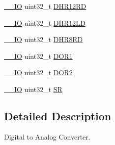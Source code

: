 \begin{DoxyCompactItemize}
\item 
\hyperlink{core__sc300_8h_aec43007d9998a0a0e01faede4133d6be}{\-\_\-\-\_\-\-I\-O} uint32\-\_\-t \hyperlink{struct_d_a_c___type_def_affa5cc9fe0cc9eb594d703bdc9d9abd9}{D\-H\-R12\-R\-D}
\item 
\hyperlink{core__sc300_8h_aec43007d9998a0a0e01faede4133d6be}{\-\_\-\-\_\-\-I\-O} uint32\-\_\-t \hyperlink{struct_d_a_c___type_def_aea4d055e3697999b44cdcf2702d79d40}{D\-H\-R12\-L\-D}
\item 
\hyperlink{core__sc300_8h_aec43007d9998a0a0e01faede4133d6be}{\-\_\-\-\_\-\-I\-O} uint32\-\_\-t \hyperlink{struct_d_a_c___type_def_a03f8d95bbf0ce3a53cb79506d5bf995a}{D\-H\-R8\-R\-D}
\item 
\hyperlink{core__sc300_8h_aec43007d9998a0a0e01faede4133d6be}{\-\_\-\-\_\-\-I\-O} uint32\-\_\-t \hyperlink{struct_d_a_c___type_def_a50b4f0b0d2a376f729c8d7acf47864c3}{D\-O\-R1}
\item 
\hyperlink{core__sc300_8h_aec43007d9998a0a0e01faede4133d6be}{\-\_\-\-\_\-\-I\-O} uint32\-\_\-t \hyperlink{struct_d_a_c___type_def_a1bde8391647d6422b39ab5ba4f13848b}{D\-O\-R2}
\item 
\hyperlink{core__sc300_8h_aec43007d9998a0a0e01faede4133d6be}{\-\_\-\-\_\-\-I\-O} uint32\-\_\-t \hyperlink{struct_d_a_c___type_def_a1d3fd83d6ed8b2d90b471db4509b0e70}{S\-R}
\end{DoxyCompactItemize}


\subsection{Detailed Description}
Digital to Analog Converter. 

